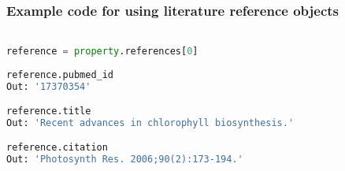 \subsubsection{Example code for using literature reference objects}

\begin{lstlisting}[language=Python]

reference = property.references[0]
	
reference.pubmed_id
Out: '17370354'

reference.title
Out: 'Recent advances in chlorophyll biosynthesis.'

reference.citation
Out: 'Photosynth Res. 2006;90(2):173-194.'

\end{lstlisting}